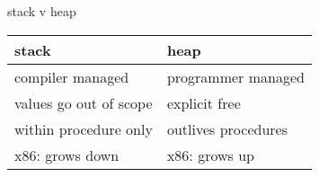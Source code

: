 \begin{frame}{stack v heap}
\begin{tabular}{ll}
stack & heap \\ \hline
compiler managed & programmer managed \\
values go out of scope & explicit free \\
within procedure only & outlives procedures \\
x86: grows down & x86: grows up \\
\end{tabular}
\end{frame}
